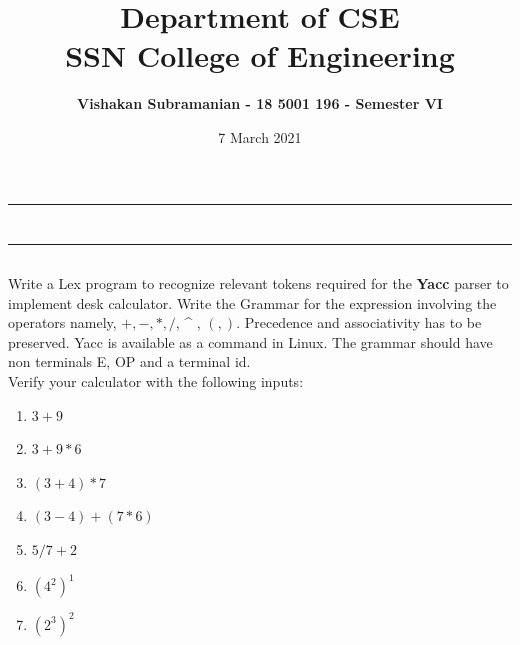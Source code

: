 \documentclass[12pt, a4]{article}
\title{\textbf{Department of CSE\\SSN College of Engineering}}
\author{\textbf{Vishakan Subramanian - 18 5001 196 - Semester VI}}
\date{7 March 2021}
\begin{document}
\maketitle
\hrule
\section*{}
\hrule
\bigskip

\subsection*{}
\subsection*{}
\begin{flushleft}
Write a Lex program to recognize relevant tokens required for the \textbf{Yacc} parser to implement desk calculator. Write the Grammar for the expression involving the operators namely, \(+ , - , * , / \), \string^ , \( ( , )  \). Precedence and associativity has to be preserved. Yacc is available as a command in Linux. The grammar should have non terminals E, OP and a terminal id.
\\
Verify your calculator with the following inputs:
\begin{enumerate}
\item $3+9$
\item $3+9*6$
\item $(3+4)*7$
\item $(3-4)+(7*6)$
\item $5/7+2$
\item $(4^2)^1$
\item $(2^3)^2$
\end{enumerate}

\end{flushleft}

\newpage
\subsection*{}
\begin{flushleft}

\end{flushleft}

\newpage
\subsection*{}
\begin{flushleft}

\end{flushleft}
\end{document}
